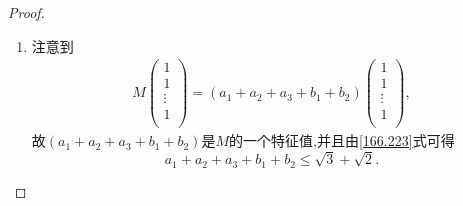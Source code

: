 \documentclass[../../main.tex]{subfiles}%
\begin{document}
\begin{proof}
\begin{enumerate}[(1)]
\begin{align*}
\end{align*}
当$\mathrm{r}\left( M \right) =2$时,不妨设
\begin{align*}
M=\begin{pmatrix}
a_1&	a_2&	a_3&	b_1&	b_2\\
a_1&	a_3&	a_2&	b_2&	b_1\\
a_1&	a_2&	a_3&	b_1&	b_2\\
a_1&	a_3&	a_2&	b_2&	b_1\\
a_1&	a_2&	a_3&	b_1&	b_2\\
\end{pmatrix},
\end{align*}
其中$a_3=\max\limits_{i=1,2,3}a_i$,$b_2=\max\limits_{i=1,2}b_i$.否则,$\mathrm{tr}M$都没有上述矩阵的迹大.则
\begin{align*}
a_1+2a_3&\leqslant 3\sqrt{\frac{a_{1}^{2}+2a_{3}^{2}}{3}}=\sqrt{3}\sqrt{\left( a_{1}^{2}+a_{2}^{2}+a_{3}^{2} \right) +a_{3}^{2}-a_{2}^{2}}\\
&=\sqrt{3}\sqrt{\left( a_{1}^{2}+a_{2}^{2}+a_{3}^{2} \right) +a_{3}^{2}-a_{2}^{2}}=\sqrt{3}\sqrt{1+a_{3}^{2}-a_{2}^{2}}\\
&\leqslant \sqrt{6}.
\end{align*}
于是
\begin{align*}
\left( \mathrm{tr}M \right) ^2=\left( a_1+2a_3+2b_2 \right) ^2\leqslant \left( \sqrt{6}+2 \right) ^2=\left( 5+2\sqrt{6} \right) \mathrm{r}\left( M \right).
\end{align*}
综上,我们有
\begin{align*}
\left( \mathrm{tr}M \right) ^2\leqslant \left( 5+2\sqrt{6} \right) \mathrm{r}\left( M \right).
\end{align*}

\item 注意到
\begin{align*}
M\left( \begin{array}{c}
1\\
1\\
\vdots\\
1\\
\end{array} \right) =\left( a_1+a_2+a_3+b_1+b_2 \right) \left( \begin{array}{c}
1\\
1\\
\vdots\\
1\\
\end{array} \right) ,
\end{align*}
故$\left( a_1+a_2+a_3+b_1+b_2 \right)$是$M$的一个特征值,并且由\eqref{166.223}式可得$$a_1+a_2+a_3+b_1+b_2\leqslant \sqrt{3}+\sqrt{2}.$$
\end{enumerate}

\end{proof}
\end{document}
